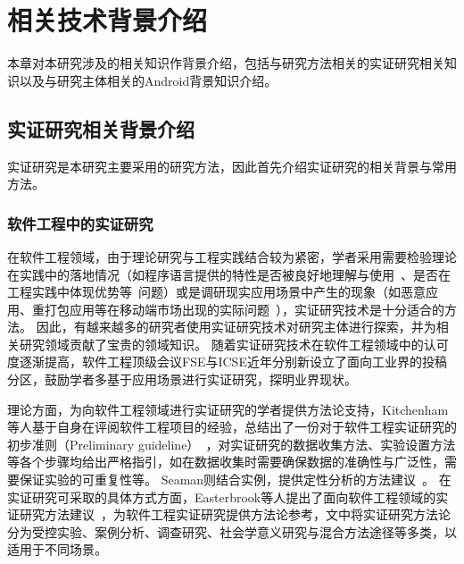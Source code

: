\chapter{相关技术背景介绍}
\label{chp:background}
%

本章对本研究涉及的相关知识作背景介绍，包括与研究方法相关的实证研究相关知识以及与研究主体相关的Android背景知识介绍。

\section{实证研究相关背景介绍}
实证研究是本研究主要采用的研究方法，因此首先介绍实证研究的相关背景与常用方法。

\subsection{软件工程中的实证研究}
在软件工程领域，由于理论研究与工程实践结合较为紧密，学者采用需要检验理论在实践中的落地情况（如程序语言提供的特性是否被良好地理解与使用~\cite{bieman1995reuse}、是否在工程实践中体现优势等~\cite{harrison2000experimental}问题）或是调研现实应用场景中产生的现象（如恶意应用、重打包应用等在移动端市场出现的实际问题~\cite{Felt2011ASO, Zhou2012DissectingAM, Andow2016ASO, wang2018android}），实证研究技术是十分适合的方法。
因此，有越来越多的研究者使用实证研究技术对研究主体进行探索\cite{Felt2011ASO, Zhou2012DissectingAM, Andow2016ASO, wang2018android, chen2018ausera, chen2018mobile, bieman1995reuse, harrison2000experimental, dybaa2008empirical, manotas2016empirical, mcintosh2016empirical, mcilroy2016fresh, wu2016ji, yang2015xin, hu2019dating, khanmohammadi2019empirical}，并为相关研究领域贡献了宝贵的领域知识。
随着实证研究技术在软件工程领域中的认可度逐渐提高，软件工程顶级会议FSE与ICSE近年分别新设立了面向工业界的投稿分区，鼓励学者多基于应用场景进行实证研究，探明业界现状。

理论方面，为向软件工程领域进行实证研究的学者提供方法论支持，Kitchenham等人基于自身在评阅软件工程项目的经验，总结出了一份对于软件工程实证研究的初步准则（Preliminary guideline）~\cite{kitchenham2002preliminary}，对实证研究的数据收集方法、实验设置方法等各个步骤均给出严格指引，如在数据收集时需要确保数据的准确性与广泛性，需要保证实验的可重复性等。
Seaman则结合实例，提供定性分析的方法建议~\cite{seaman1999qualitative}。
在实证研究可采取的具体方式方面，Easterbrook等人提出了面向软件工程领域的实证研究方法建议~\cite{easterbrook2008selecting}，为软件工程实证研究提供方法论参考，文中将实证研究方法论分为受控实验、案例分析、调查研究、社会学意义研究与混合方法途径等多类，以适用于不同场景。

